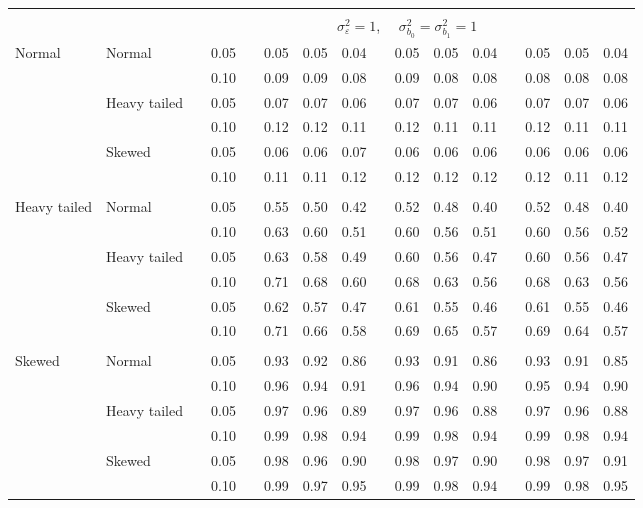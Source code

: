 \begin{table}[ht]
\begin{scriptsize}
\begin{tabular}{ll p{.1cm} c p{.1cm} rrr p{.1cm} rrr p{.1cm} rrr}
&&&&&&&&&&&&&&&\\
& && && \multicolumn{9}{c}{$\sigma_{\varepsilon}^2 = 1$, \ \ $\sigma_{b_0}^2 = \sigma_{b_1}^2 = 1$} \\ \cline{6-16}
\rowcolor{gray!20} Normal       & Normal       && 0.05 &&   0.05 & 0.05 & 0.04 && 0.05 & 0.05 & 0.04 && 0.05 & 0.05 & 0.04 \\ 
\rowcolor{gray!20}             &              && 0.10 &&   0.09 & 0.09 & 0.08 && 0.09 & 0.08 & 0.08 && 0.08 & 0.08 & 0.08 \\ 
\rowcolor{gray!20}             & Heavy tailed && 0.05 &&   0.07 & 0.07 & 0.06 && 0.07 & 0.07 & 0.06 && 0.07 & 0.07 & 0.06 \\ 
\rowcolor{gray!20}             &              && 0.10 &&   0.12 & 0.12 & 0.11 && 0.12 & 0.11 & 0.11 && 0.12 & 0.11 & 0.11 \\ 
\rowcolor{gray!20}             & Skewed       && 0.05 &&   0.06 & 0.06 & 0.07 && 0.06 & 0.06 & 0.06 && 0.06 & 0.06 & 0.06 \\ 
\rowcolor{gray!20}             &              && 0.10 &&   0.11 & 0.11 & 0.12 && 0.12 & 0.12 & 0.12 && 0.12 & 0.11 & 0.12 \\
             &&&&&&&&&&&&&&&\\  
Heavy tailed & Normal       && 0.05 &&   0.55 & 0.50 & 0.42 && 0.52 & 0.48 & 0.40 && 0.52 & 0.48 & 0.40 \\ 
             &              && 0.10 &&   0.63 & 0.60 & 0.51 && 0.60 & 0.56 & 0.51 && 0.60 & 0.56 & 0.52 \\ 
             & Heavy tailed && 0.05 &&   0.63 & 0.58 & 0.49 && 0.60 & 0.56 & 0.47 && 0.60 & 0.56 & 0.47 \\ 
             &              && 0.10 &&   0.71 & 0.68 & 0.60 && 0.68 & 0.63 & 0.56 && 0.68 & 0.63 & 0.56 \\ 
             & Skewed       && 0.05 &&   0.62 & 0.57 & 0.47 && 0.61 & 0.55 & 0.46 && 0.61 & 0.55 & 0.46 \\ 
             &              && 0.10 &&   0.71 & 0.66 & 0.58 && 0.69 & 0.65 & 0.57 && 0.69 & 0.64 & 0.57 \\ 
             &&&&&&&&&&&&&&&\\ 
Skewed       & Normal       && 0.05 &&   0.93 & 0.92 & 0.86 && 0.93 & 0.91 & 0.86 && 0.93 & 0.91 & 0.85 \\ 
             &              && 0.10 &&   0.96 & 0.94 & 0.91 && 0.96 & 0.94 & 0.90 && 0.95 & 0.94 & 0.90 \\ 
             & Heavy tailed && 0.05 &&   0.97 & 0.96 & 0.89 && 0.97 & 0.96 & 0.88 && 0.97 & 0.96 & 0.88 \\ 
             &              && 0.10 &&   0.99 & 0.98 & 0.94 && 0.99 & 0.98 & 0.94 && 0.99 & 0.98 & 0.94 \\ 
             & Skewed       && 0.05 &&   0.98 & 0.96 & 0.90 && 0.98 & 0.97 & 0.90 && 0.98 & 0.97 & 0.91 \\ 
             &              && 0.10 &&   0.99 & 0.97 & 0.95 && 0.99 & 0.98 & 0.94 && 0.99 & 0.98 & 0.95 \\ 



\end{tabular}
\end{scriptsize}
\end{table}
